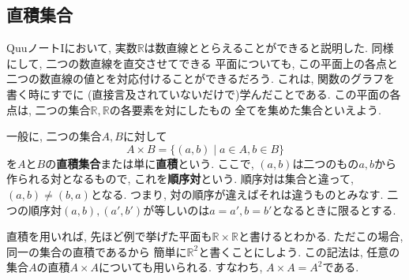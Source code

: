 \documentclass[a4j,dvipdfmx]{jsarticle}
\numberwithin{equation}{section}
\begin{document}
        \subsection{直積集合}
            QuuノートIにおいて, 実数$\mathbb{R}$は数直線ととらえることができると説明した. 同様にして, 二つの数直線を直交させてできる
            平面についても, この平面上の各点と二つの数直線の値とを対応付けることができるだろう. これは, 関数のグラフを書く時にすでに
            (直接言及されていないだけで)学んだことである. この平面の各点は, 二つの集合$\mathbb{R},\mathbb{R}$の各要素を対にしたもの
            全てを集めた集合といえよう.
            \begin{figure}[h]
                \centering
            \end{figure}

            一般に, 二つの集合$A,B$に対して
            \begin{equation}
                A\times B =\{(a,b)\mid a\in A,b\in B\} \label{eq:集合論基礎:直積の定義}
            \end{equation}
            を$A$と$B$の\textbf{直積集合}または単に\textbf{直積}という. ここで, $(a,b)$は二つのもの$a,b$から作られる対となるもので, 
            これを\textbf{順序対}という. 順序対は集合と違って, $(a,b)\neq (b,a)$となる. つまり, 対の順序が違えばそれは違うものとみなす.
            二つの順序対$(a,b),(a',b')$が等しいのは$a=a',b=b'$となるときに限るとする. 

            直積を用いれば, 先ほど例で挙げた平面も$\mathbb{R}\times \mathbb{R}$と書けるとわかる. ただこの場合, 同一の集合の直積であるから
            簡単に$\mathbb{R}^2$と書くことにしよう. この記法は, 任意の集合$A$の直積$A\times A$についても用いられる. すなわち, $A\times A=A^2$である.
\end{document}
